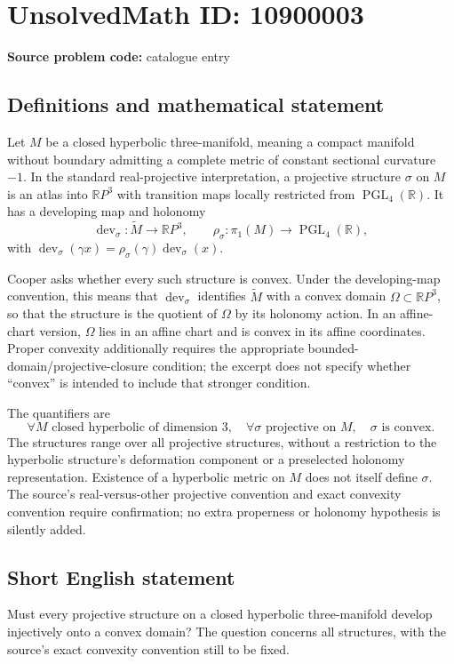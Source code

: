 \documentclass[11pt]{article}
\newcommand{\R}{\mathbb{R}}
\begin{document}
\section*{UnsolvedMath ID: 10900003}
\textbf{Source problem code:} catalogue entry
\subsection{Definitions and mathematical statement}
Let \(M\) be a closed hyperbolic three-manifold, meaning a compact manifold without boundary admitting a complete metric of constant sectional curvature \(-1\). In the standard real-projective interpretation, a projective structure \(\sigma\) on \(M\) is an atlas into \(\R P^3\) with transition maps locally restricted from \(\operatorname{PGL}_4(\R)\). It has a developing map and holonomy
\[\operatorname{dev}_\sigma:\widetilde M\to\R P^3,\qquad
\rho_\sigma:\pi_1(M)\to\operatorname{PGL}_4(\R),\]
with \(\operatorname{dev}_\sigma(\gamma x)=\rho_\sigma(\gamma)\operatorname{dev}_\sigma(x)\).

Cooper asks whether every such structure is convex. Under the developing-map convention, this means that \(\operatorname{dev}_\sigma\) identifies \(\widetilde M\) with a convex domain \(\Omega\subset\R P^3\), so that the structure is the quotient of \(\Omega\) by its holonomy action. In an affine-chart version, \(\Omega\) lies in an affine chart and is convex in its affine coordinates. Proper convexity additionally requires the appropriate bounded-domain/projective-closure condition; the excerpt does not specify whether ``convex'' is intended to include that stronger condition.

The quantifiers are
\[\forall M\text{ closed hyperbolic of dimension }3,\quad
\forall\sigma\text{ projective on }M,\quad\sigma\text{ is convex}.\]
The structures range over all projective structures, without a restriction to the hyperbolic structure's deformation component or a preselected holonomy representation. Existence of a hyperbolic metric on \(M\) does not itself define \(\sigma\). The source's real-versus-other projective convention and exact convexity convention require confirmation; no extra properness or holonomy hypothesis is silently added.
\subsection{Short English statement}
Must every projective structure on a closed hyperbolic three-manifold develop injectively onto a convex domain? The question concerns all structures, with the source's exact convexity convention still to be fixed.
\end{document}
